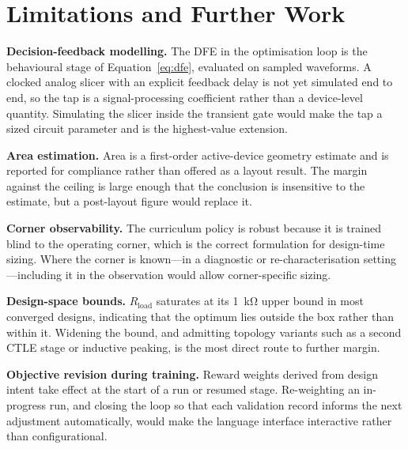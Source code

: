 \documentclass[10pt,a4paper]{article}
\begin{document}
\section{Limitations and Further Work}
\label{sec:limitations}

\textbf{Decision-feedback modelling.} The DFE in the optimisation loop is the
behavioural stage of Equation~\eqref{eq:dfe}, evaluated on sampled waveforms. A
clocked analog slicer with an explicit feedback delay is not yet simulated end to
end, so the tap is a signal-processing coefficient rather than a device-level
quantity. Simulating the slicer inside the transient gate would make the tap a
sized circuit parameter and is the highest-value extension.

\textbf{Area estimation.} Area is a first-order active-device geometry estimate
and is reported for compliance rather than offered as a layout result. The margin
against the ceiling is large enough that the conclusion is insensitive to the
estimate, but a post-layout figure would replace it.

\textbf{Corner observability.} The curriculum policy is robust because it is
trained blind to the operating corner, which is the correct formulation for
design-time sizing. Where the corner is known---in a diagnostic or
re-characterisation setting---including it in the observation would allow
corner-specific sizing.

\textbf{Design-space bounds.} $R_\mathrm{load}$ saturates at its
\SI{1}{\kilo\ohm} upper bound in most converged designs, indicating that the
optimum lies outside the box rather than within it. Widening the bound, and
admitting topology variants such as a second CTLE stage or inductive peaking,
is the most direct route to further margin.

\textbf{Objective revision during training.} Reward weights derived from design
intent take effect at the start of a run or resumed stage. Re-weighting an
in-progress run, and closing the loop so that each validation record informs the
next adjustment automatically, would make the language interface interactive
rather than configurational.


\end{document}

